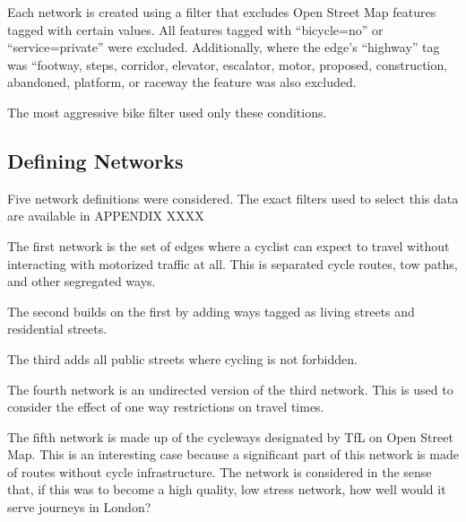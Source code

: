 \documentclass[11pt]{article} %
\begin{document}
Each network is created using a filter that excludes Open Street Map features tagged with certain values. All features tagged with ``bicycle=no'' or ``service=private'' were excluded. Additionally, where the edge's ``highway'' tag was ``footway, steps, corridor, elevator, escalator, motor, proposed, construction, abandoned, platform, or raceway the feature was also excluded. 

The most aggressive bike filter used only these conditions.





 

\subsection{Defining Networks}

Five network definitions were considered. The exact filters used to select this data are available in APPENDIX XXXX 

The first network is the set of edges where a cyclist can expect to travel without interacting with motorized traffic at all. This is separated cycle routes, tow paths, and other segregated ways. 

The second builds on the first by adding ways tagged as living streets and residential streets.

The third adds all public streets where cycling is not forbidden. 

The fourth network is an undirected version of the third network. This is used to consider the effect of one way restrictions on travel times. 

The fifth network is made up of the cycleways designated by TfL on Open Street Map. This is an interesting case because a significant part of this network is made of routes without cycle infrastructure. The network is considered in the sense that, if this was to become a high quality, low stress network, how well would it serve journeys in London? 
\end{document}
